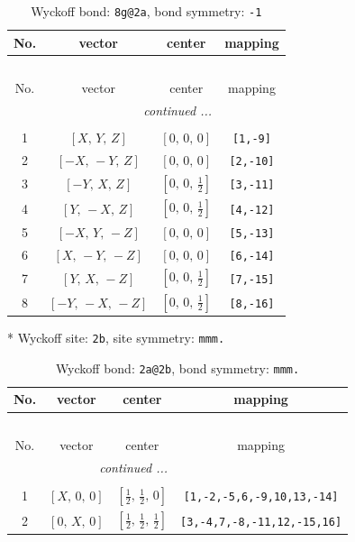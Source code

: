 \documentclass[fleqn,8pt]{jsarticle}
\begin{document}
\renewcommand{\arraystretch}{1.2}
\begin{longtable}{cccc}
\caption{Wyckoff bond: {\tt 8g@2a}, bond symmetry: {\tt -1}}
 \\
 \hline \hline
No. & vector & center & mapping \\ \hline \endfirsthead

\multicolumn{3}{l}{\tablename\ \thetable{}} \\
 \hline \hline
No. & vector & center & mapping \\ \hline \endhead

 \hline \hline
\multicolumn{3}{r}{\footnotesize\it continued ...} \\ \endfoot

 \hline \hline
\multicolumn{3}{r}{} \\ \endlastfoot

1 & $\left[ X,\, Y,\, Z \right]$ & $\left[ 0,\, 0,\, 0 \right]$ & {\tt [1,-9]} \\ \hline
2 & $\left[ - X,\, - Y,\, Z \right]$ & $\left[ 0,\, 0,\, 0 \right]$ & {\tt [2,-10]} \\ \hline
3 & $\left[ - Y,\, X,\, Z \right]$ & $\left[ 0,\, 0,\, \frac{1}{2} \right]$ & {\tt [3,-11]} \\ \hline
4 & $\left[ Y,\, - X,\, Z \right]$ & $\left[ 0,\, 0,\, \frac{1}{2} \right]$ & {\tt [4,-12]} \\ \hline
5 & $\left[ - X,\, Y,\, - Z \right]$ & $\left[ 0,\, 0,\, 0 \right]$ & {\tt [5,-13]} \\ \hline
6 & $\left[ X,\, - Y,\, - Z \right]$ & $\left[ 0,\, 0,\, 0 \right]$ & {\tt [6,-14]} \\ \hline
7 & $\left[ Y,\, X,\, - Z \right]$ & $\left[ 0,\, 0,\, \frac{1}{2} \right]$ & {\tt [7,-15]} \\ \hline
8 & $\left[ - Y,\, - X,\, - Z \right]$ & $\left[ 0,\, 0,\, \frac{1}{2} \right]$ & {\tt [8,-16]} \\
\end{longtable}
* Wyckoff site: {\tt 2b}, site symmetry: {\tt mmm.}
\renewcommand{\arraystretch}{1.2}
\begin{longtable}{cccc}
\caption{Wyckoff bond: {\tt 2a@2b}, bond symmetry: {\tt mmm.}}
 \\
 \hline \hline
No. & vector & center & mapping \\ \hline \endfirsthead

\multicolumn{3}{l}{\tablename\ \thetable{}} \\
 \hline \hline
No. & vector & center & mapping \\ \hline \endhead

 \hline \hline
\multicolumn{3}{r}{\footnotesize\it continued ...} \\ \endfoot

 \hline \hline
\multicolumn{3}{r}{} \\ \endlastfoot

1 & $\left[ X,\, 0,\, 0 \right]$ & $\left[ \frac{1}{2},\, \frac{1}{2},\, 0 \right]$ & {\tt [1,-2,-5,6,-9,10,13,-14]} \\ \hline
2 & $\left[ 0,\, X,\, 0 \right]$ & $\left[ \frac{1}{2},\, \frac{1}{2},\, \frac{1}{2} \right]$ & {\tt [3,-4,7,-8,-11,12,-15,16]} \\
\end{longtable}
\end{document}
